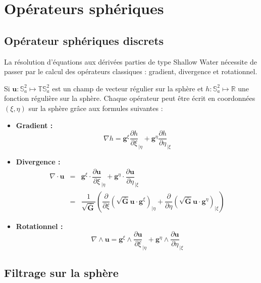 
\chapter{Opérateurs sphériques}

\section{Opérateur sphériques discrets}

La résolution d'équations aux dérivées parties de type Shallow Water nécessite de passer par le calcul des opérateurs classiques : gradient, divergence et rotationnel.

Si $\mathbf{u} : \mathbb{S}_a^2 \mapsto \mathbb{T}\mathbb{S}_a^2$ est un champ de vecteur régulier sur la sphère et $h : \mathbb{S}_a^2 \mapsto\mathbb{R}$ une fonction régulière sur la sphère.
Chaque opérateur peut être écrit en coordonnées $(\xi, \eta)$ sur la sphère grâce aux formules suivantes :

\begin{itemize}
\item \textbf{Gradient :}
\begin{equation}
\nabla h = \mathbf{g}^{\xi} \dfrac{\partial h}{\partial \xi}_{|\eta} + \mathbf{g}^{\eta} \dfrac{\partial h}{\partial \eta}_{|\xi} 
\label{eq: gradient}
\end{equation}
\item \textbf{Divergence :}
\begin{equation}
\begin{array}{rcl}
\nabla \cdot \mathbf{u} & = & \mathbf{g}^{\xi} \cdot \dfrac{\partial \mathbf{u}}{\partial \xi}_{|\eta} + \mathbf{g}^{\eta} \cdot \dfrac{\partial \mathbf{u}}{\partial \eta}_{|\xi} \\
	& = & \dfrac{1}{\sqrt{\bar{\mathbf{G}}}} \left( \dfrac{\partial}{\partial \xi} \left( \sqrt{\bar{\mathbf{G}}} \mathbf{u} \cdot \mathbf{g}^{\xi} \right)_{|\eta} + \dfrac{\partial}{\partial \eta} \left( \sqrt{\bar{\mathbf{G}}} \mathbf{u} \cdot \mathbf{g}^{\eta} \right)_{|\xi} \right) 
\end{array}
\label{eq: divergence}
\end{equation}
\item \textbf{Rotationnel :}
\begin{equation}
\nabla \wedge \mathbf{u} = \mathbf{g}^{\xi} \wedge \dfrac{\partial \mathbf{u}}{\partial \xi}_{|\eta} + \mathbf{g}^{\eta} \wedge \dfrac{\partial \mathbf{u}}{\partial \eta}_{|\xi}  
\label{eq: rotationnel}
\end{equation}
\end{itemize}




\section{Filtrage sur la sphère}